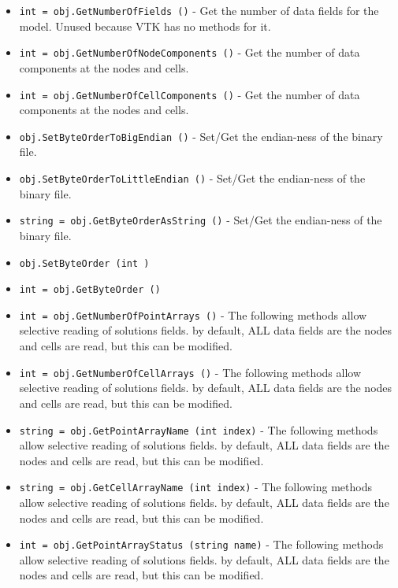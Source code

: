 \begin{itemize}
\item  \verb|int = obj.GetNumberOfFields ()| -  Get the number of data fields for the model. Unused because VTK
 has no methods for it.

\item  \verb|int = obj.GetNumberOfNodeComponents ()| -  Get the number of data components at the nodes and cells.

\item  \verb|int = obj.GetNumberOfCellComponents ()| -  Get the number of data components at the nodes and cells.

\item  \verb|obj.SetByteOrderToBigEndian ()| -  Set/Get the endian-ness of the binary file.

\item  \verb|obj.SetByteOrderToLittleEndian ()| -  Set/Get the endian-ness of the binary file.

\item  \verb|string = obj.GetByteOrderAsString ()| -  Set/Get the endian-ness of the binary file.

\item  \verb|obj.SetByteOrder (int )|

\item  \verb|int = obj.GetByteOrder ()|

\item  \verb|int = obj.GetNumberOfPointArrays ()| -  The following methods allow selective reading of solutions fields.  by
 default, ALL data fields are the nodes and cells are read, but this can
 be modified.

\item  \verb|int = obj.GetNumberOfCellArrays ()| -  The following methods allow selective reading of solutions fields.  by
 default, ALL data fields are the nodes and cells are read, but this can
 be modified.

\item  \verb|string = obj.GetPointArrayName (int index)| -  The following methods allow selective reading of solutions fields.  by
 default, ALL data fields are the nodes and cells are read, but this can
 be modified.

\item  \verb|string = obj.GetCellArrayName (int index)| -  The following methods allow selective reading of solutions fields.  by
 default, ALL data fields are the nodes and cells are read, but this can
 be modified.

\item  \verb|int = obj.GetPointArrayStatus (string name)| -  The following methods allow selective reading of solutions fields.  by
 default, ALL data fields are the nodes and cells are read, but this can
 be modified.


\end{itemize}
